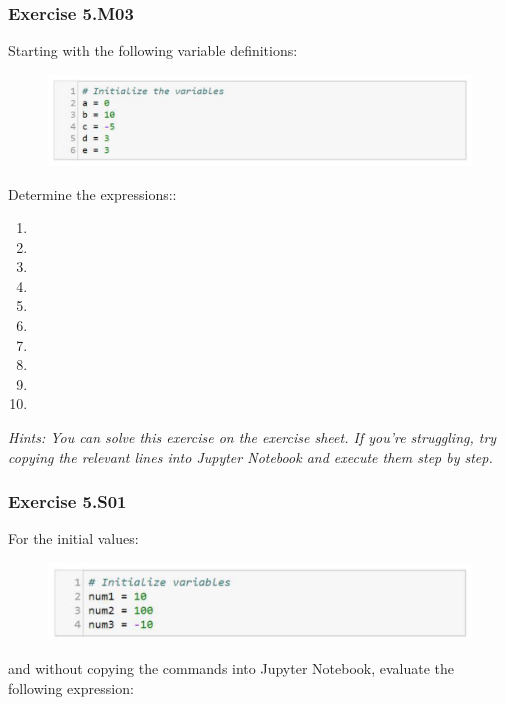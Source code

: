 \subsubsection*{Exercise 5.M03 \red{[M]}}
Starting with the following variable definitions:
\begin{figure}[H]
		\centering
		\includegraphics[width=\textwidth]{../IMG/5M03.png} 
\end{figure}
Determine the expressions::
\begin{enumerate}[label=(\alph*)]
	\item {}
	\item {}
	\item {}
	\item {}
	\item {}
	\item {}
	\item {}
	\item {}
	\item {}
	\item {}
\end{enumerate}

\textit{Hints:
You can solve this exercise on the exercise sheet. If you’re struggling, try copying the relevant lines into Jupyter Notebook and execute them step by step.}\\[1cm]



\subsubsection*{Exercise 5.S01}
For the initial values:
\begin{figure}[H]
		\centering
		\includegraphics[width=\textwidth]{../IMG/5S01.png} 
\end{figure}
and without copying the commands into Jupyter Notebook, evaluate the following
expression:
\begin{center}
	{}
\end{center}


